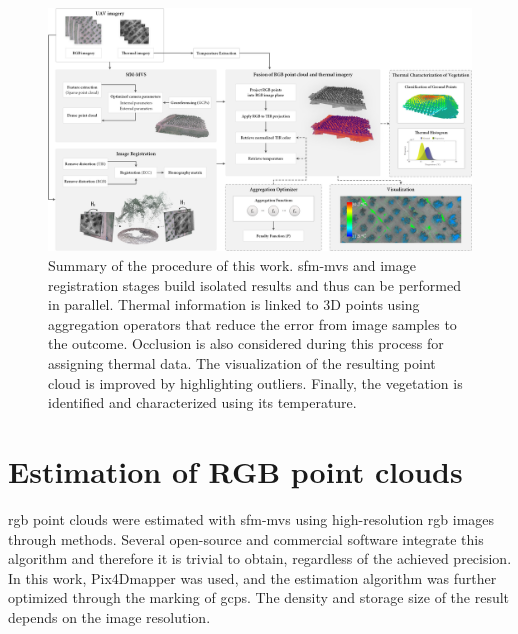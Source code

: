\begin{figure}
    \centering
    \caption{Summary of the procedure of this work. \acrshort{sfm}-\acrshort{mvs} and image registration stages build isolated results and thus can be performed in parallel. Thermal information is linked to 3D points using aggregation operators that reduce the error from image samples to the outcome. Occlusion is also considered during this process for assigning thermal data. The visualization of the resulting point cloud is improved by highlighting outliers. Finally, the vegetation is identified and characterized using its temperature. }
    \label{fig:thermal_projection_overview}
    \includegraphics[width=\linewidth]{figs/thermal_projection/thermal_projection.png}
\end{figure}

\section{Estimation of RGB point clouds}

\acrshort{rgb} point clouds were estimated with \acrshort{sfm}-\acrshort{mvs} using high-resolution \acrshort{rgb} images through methods. Several open-source and commercial software integrate this algorithm and therefore it is trivial to obtain, regardless of the achieved precision. In this work, Pix4Dmapper was used, and the estimation algorithm was further optimized through the marking of \acrshort{gcp}s. The density and storage size of the result depends on the image resolution.

